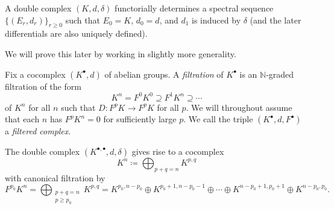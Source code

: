 \documentclass[../notes.tex]{subfiles}
\begin{document}
\begin{theorem}
	A double complex $(K,d,\delta)$ functorially determines a spectral sequence $\{(E_r,d_r)\}_{r\ge0}$ such that $E_0=K$, $d_0=d$, and $d_1$ is induced by $\delta$ (and the later differentials are also uniquely defined).
\end{theorem}
We will prove this later by working in slightly more generality.
\begin{definition}[filtration]
	Fix a cocomplex $(K^\bullet,d)$ of abelian groups. A \textit{filtration} of $K^\bullet$ is an $\mathbb N$-graded filtration of the form
	\[K^n=F^0K^0\supseteq F^1K^n\supseteq\cdots\]
	of $K^n$ for all $n$ such that $D\colon F^pK\to F^pK$ for all $p$. We will throughout assume that each $n$ has $F^pK^n=0$ for sufficiently large $p$. We call the triple $(K^\bullet,d,F^\bullet)$ a \textit{filtered complex}.
\end{definition}
\begin{example}
	The double complex $(K^{\bullet,\bullet},d,\delta)$ gives rise to a cocomplex
	\[K^n\coloneqq\bigoplus_{p+q=n}K^{p,q}\]
	with canonical filtration by
	\[F^{p_0}K^n=\bigoplus_{\substack{p+q=n\\p\ge p_0}}K^{p,q}=K^{p_0,n-p_0}\oplus K^{p_0+1,n-p_0-1}\oplus\cdots\oplus K^{n-p_0+1,p_0+1}\oplus K^{n-p_0,p_0}.\]
\end{example}
\end{document}
